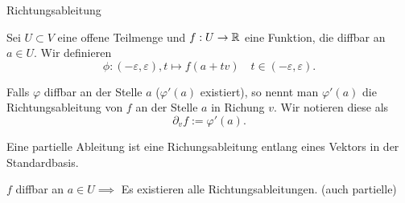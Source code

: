 \documentclass[class=article, crop=false]{standalone}
\begin{document}
\begin{zettel}{Richtungsableitung}
\begin{flashcard}
\begin{definition}
    Sei $U \subset V$ eine offene Teilmenge und $f: U \to \mathbb{R} $ eine Funktion, die diffbar an $a \in   U$. Wir definieren
\[
\phi : (-\varepsilon,\varepsilon), t \mapsto f (a+ tv) \quad t \in  (-\varepsilon,\varepsilon) 
.\]

Falls $\varphi$ diffbar an der Stelle $a$ ($\varphi'(a)$ existiert), so nennt man $\varphi '(a)$ die Richtungsableitung von $f$ an der Stelle $a$ in Richung $v$. Wir notieren diese als
\[
    \partial_v f := \varphi ' (a)
.\]
\end{definition}
\end{flashcard}

\begin{remark}
Eine partielle Ableitung ist eine Richungsableitung entlang eines Vektors in der Standardbasis.
\end{remark}

\begin{theorem}
    $f$ diffbar an $a \in  U \implies $ Es existieren alle Richtungsableitungen. (auch partielle)
\end{theorem}

\end{zettel}
\end{document}
